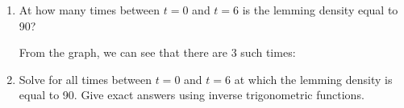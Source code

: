 \documentclass{article}
\begin{document}
\begin{enumerate}
\begin{enumerate}
\begin{solution}
      Based on our sketch, it makes most sense to model with a cosine
      function, since the function we're modeling has a maximum at $t =
      0$.  So, the model is $L(t) = 490 \cos \left( \frac{2 \pi}{4} t
      \right) + 510$, which simplifies to $\boxed{L(t)=490 \cos \left(
          \frac{\pi}{2} t \right) + 510}$. 
    \end{solution}

  \item
    \begin{problem}[\vfill]
      At how many times between $t = 0$ and $t = 6$ is the lemming density
      equal to 90?
    \end{problem}

    \begin{solution}
      From the graph, we can see that there are 3 such times:
      \begin{center}
      \end{center}    
    \end{solution}

    \pspace{\newpage}
    
\item
    \begin{problem}
        Solve for all times between $t=0$ and $t=6$ at which the lemming density is equal to 90. Give exact answers using inverse trigonometric functions.
    \end{problem}
    \pspace{\vfill}


\end{enumerate}
\end{enumerate}
\end{document}
